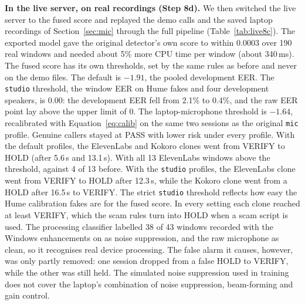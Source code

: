 \documentclass[10pt,a4paper,twocolumn]{article}
\begin{document}
\textbf{In the live server, on real recordings (Step 8d).} We then switched the live server to the fused score and replayed the demo calls and the saved laptop recordings of Section~\ref{sec:mic} through the full pipeline (Table~\ref{tab:live8c}). The exported model gave the original detector's own score to within 0.0003 over 190 real windows and needed about 5\% more CPU time per window (about 340\,ms). The fused score has its own thresholds, set by the same rules as before and never on the demo files. The default is $-1.91$, the pooled development EER. The \texttt{studio} threshold, the window EER on Hume fakes and four development speakers, is 0.00: the development EER fell from 2.1\% to 0.4\%, and the raw EER point lay above the upper limit of 0. The laptop-microphone threshold is $-1.64$, recalibrated with Equation~\ref{eq:calib} on the same two sessions as the original \texttt{mic} profile. Genuine callers stayed at PASS with lower risk under every profile. With the default profiles, the ElevenLabs and Kokoro clones went from VERIFY to HOLD (after 5.6\,s and 13.1\,s). With all 13 ElevenLabs windows above the threshold, against 4 of 13 before. With the \texttt{studio} profiles, the ElevenLabs clone went from VERIFY to HOLD after 12.3\,s, while the Kokoro clone went from a HOLD after 16.5\,s to VERIFY. The strict \texttt{studio} threshold reflects how easy the Hume calibration fakes are for the fused score. In every setting each clone reached at least VERIFY, which the scam rules turn into HOLD when a scam script is used. The processing classifier labelled 38 of 43 windows recorded with the Windows enhancements on as noise suppression, and the raw microphone as clean, so it recognises real device processing. The false alarm it causes, however, was only partly removed: one session dropped from a false HOLD to VERIFY, while the other was still held. The simulated noise suppression used in training does not cover the laptop's combination of noise suppression, beam-forming and gain control.
\end{document}
